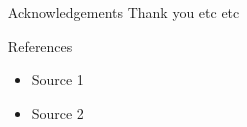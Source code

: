 \documentclass[final]{beamer}
\newlength{\sepwid}
\newlength{\onecolwid}
\begin{document}
\begin{frame}[t]
\begin{block}
\begin{columns}[t]
\begin{column}{\sepwid}\end{column} %

\begin{column}{\onecolwid}
  \begin{alertblock}{Acknowledgements}
    Thank you etc etc
  \end{alertblock}

  \begin{alertblock}{References}
    \begin{itemize}
      \item Source 1
      \item Source 2
    \end{itemize}
  \end{alertblock}
\end{column}
\begin{column}{\sepwid}\end{column} %
\end{columns} %
\end{block}


\end{frame} %
\end{document}
